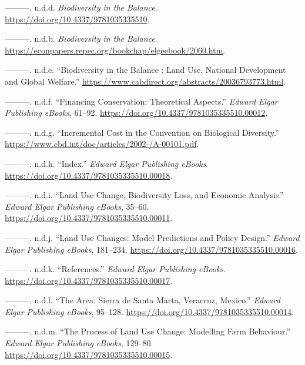 \begin{CSLReferences}{1}{0}
---------. n.d.d. \emph{Biodiversity in the Balance}.
\url{https://doi.org/10.4337/9781035335510}.

---------. n.d.b. \emph{Biodiversity in the Balance}.
\url{https://econpapers.repec.org/bookchap/elgeebook/2060.htm}.

---------. n.d.e. {``Biodiversity in the Balance : Land Use, National
Development and Global Welfare.''}
\url{https://www.cabdirect.org/abstracts/20036793773.html}.

---------. n.d.f. {``Financing Conservation: Theoretical Aspects.''}
\emph{Edward Elgar Publishing eBooks}, 61--92.
\url{https://doi.org/10.4337/9781035335510.00012}.

---------. n.d.g. {``Incremental Cost in the Convention on Biological
Diversity.''} \url{https://www.cbd.int/doc/articles/2002-/A-00101.pdf}.

---------. n.d.h. {``Index.''} \emph{Edward Elgar Publishing eBooks}.
\url{https://doi.org/10.4337/9781035335510.00018}.

---------. n.d.i. {``Land Use Change, Biodiversity Loss, and Economic
Analysis.''} \emph{Edward Elgar Publishing eBooks}, 35--60.
\url{https://doi.org/10.4337/9781035335510.00011}.

---------. n.d.j. {``Land Use Changes: Model Predictions and Policy
Design.''} \emph{Edward Elgar Publishing eBooks}, 181--234.
\url{https://doi.org/10.4337/9781035335510.00016}.

---------. n.d.k. {``References.''} \emph{Edward Elgar Publishing
eBooks}. \url{https://doi.org/10.4337/9781035335510.00017}.

---------. n.d.l. {``The Area: Sierra de Santa Marta, Veracruz,
Mexico.''} \emph{Edward Elgar Publishing eBooks}, 95--128.
\url{https://doi.org/10.4337/9781035335510.00014}.

---------. n.d.m. {``The Process of Land Use Change: Modelling Farm
Behaviour.''} \emph{Edward Elgar Publishing eBooks}, 129--80.
\url{https://doi.org/10.4337/9781035335510.00015}.


\end{CSLReferences}
